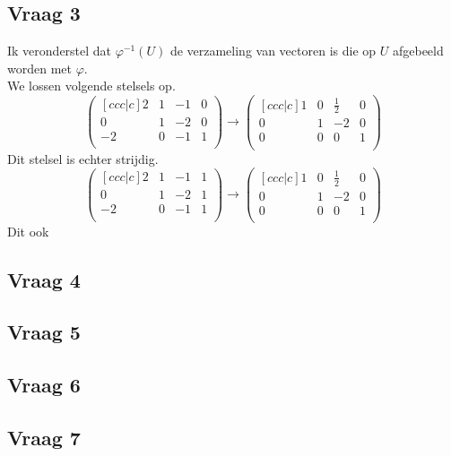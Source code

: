 \documentclass[lineaire_algebra_oplossingen.tex]{subfiles}
\begin{document}
\subsection{Vraag 3}
Ik veronderstel dat $\varphi^{-1}(U)$ de verzameling van vectoren is die op $U$ afgebeeld worden met $\varphi$.\\
We lossen volgende stelsels op.
\[
\begin{pmatrix}[c c c | c]
2 & 1 & -1 & 0\\
0 & 1 & -2 & 0\\
-2 & 0 &-1 & 1\\
\end{pmatrix}
\rightarrow
\begin{pmatrix}[c c c | c]
1 & 0 & \frac{1}{2} & 0\\
0 & 1 & -2 & 0\\
0 & 0 & 0 & 1\\
\end{pmatrix}
\]
Dit stelsel is echter strijdig. %
\[
\begin{pmatrix}[c c c | c]
2 & 1 & -1 & 1\\
0 & 1 & -2 & 1\\
-2 & 0 &-1 & 1\\
\end{pmatrix}
\rightarrow
\begin{pmatrix}[c c c | c]
1 & 0 & \frac{1}{2} & 0\\
0 & 1 & -2 & 0\\
0 & 0 & 0 & 1\\
\end{pmatrix}
\]
Dit ook %


\subsection{Vraag 4}

\subsection{Vraag 5}

\subsection{Vraag 6}

\subsection{Vraag 7}
\end{document}
